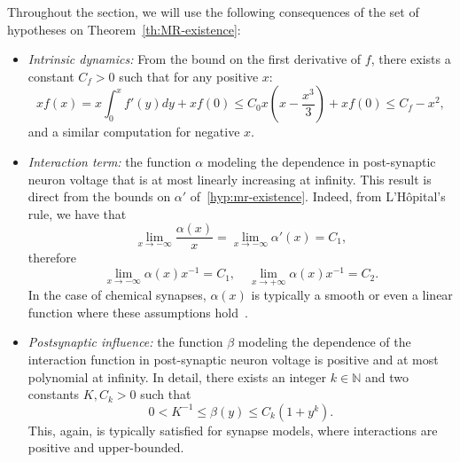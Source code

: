 \documentclass[onefignum,onetabnum]{siamart190516}
\newcommand{\1}{\mathbbm{1}}
\newcommand{\review}[1]{\textcolor{midblue}{ #1}}
\renewcommand{\review}[1]{{ #1}}
\begin{document}
Throughout the section, we will use the following consequences of the set of hypotheses on Theorem~\ref{th:MR-existence}:
\begin{itemize}
\item \emph{Intrinsic dynamics:} From the bound on the first derivative of $f$, there exists a constant $C_f>0$ such that for any positive $x$:
\begin{equation}
\label{hyp:h1}
xf(x) = x\int_0^x f'(y)dy +xf(0) \leq  C_0x\left(x-\frac{x^3}{3}\right) +xf(0) \leq C_f-x^2,
\end{equation}
and a similar computation for negative $x$. 
%
%
\item \textit{Interaction term:} the function $\alpha$ modeling the dependence in post-synaptic neuron voltage that is at most linearly increasing at infinity. This result is direct from the bounds on $\alpha'$ of~\eqref{hyp:mr-existence}. Indeed, from L'H\^opital's rule, we have that
$$
\lim_{x\rightarrow-\infty}\frac{\alpha(x)}{x} = \lim_{x\rightarrow-\infty}\alpha'(x) =C_1,
$$
therefore
\begin{equation}
\label{hyp:h2}
\lim_{x\rightarrow-\infty}\alpha(x)x^{-1}=C_1,\quad \lim_{x\rightarrow+\infty}\alpha(x)x^{-1} = C_2.
\end{equation}
\review{In the case of chemical synapses, $\alpha(x)$ is typically a smooth or even a linear function where these assumptions hold~\cite{destexhe1998kinetic,yao2023plasticity}. }
\item \textit{Postsynaptic influence:}  the function $\beta$ modeling the dependence of the interaction function in post-synaptic neuron voltage is positive and at most polynomial at infinity. In detail, there exists an integer $k\in\mathbb N$ and two constants $K,C_k>0$ such that
\begin{equation}
\label{hyp:h3}
0<K^{-1}\leq \beta(y)\leq C_k(1+y^{k}).
\end{equation}
This, again, is typically satisfied for synapse models, where interactions are positive and upper-bounded.
\end{itemize}

\end{document}
